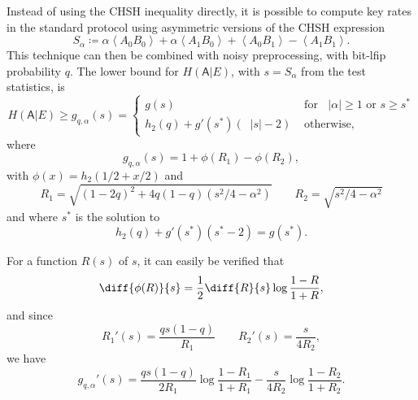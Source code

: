 \documentclass[10pt, a4paper]{article}
\numberwithin{equation}{section} %
\theoremstyle{definition}
\theoremstyle{plain}
\newcommand{\abs}[1]{\mathop{}\left\lvert#1\right\rvert}
\newcommand{\?}{\mathrel{?}} %
\newcommand{\angleb}[1]{\left\langle #1 \right\rangle} %
\newcommand{\crv}[1]{\mathsf{#1}}
\begin{document}
\begin{appendices}
                            Instead of using the CHSH inequality directly, it is possible to compute key rates in the standard protocol using asymmetric versions of the CHSH expression
                            \begin{equation}
                              S_{\alpha} \coloneqq \alpha\angleb{A_0 B_0} + \alpha\angleb{A_1 B_0} + \angleb{A_0 B_1} - \angleb{A_1 B_1}.
                            \end{equation}
                            This technique can then be combined with noisy preprocessing, with bit-lfip probability \(q\). The lower bound for \(H(\crv{A}|E)\), with \(s = S_{\alpha}\) from the test statistics, is
                            \begin{equation} H(\crv{A}|E) \geq g_{q,\alpha}(s) = \begin{cases}
                              g(s) & \text{ for } \abs{\alpha} \geq 1 \text{ or } s \geq s^* \\
                              h_2(q) + g'(s^*)(\abs{s}-2) & \text{ otherwise},
                            \end{cases}
                          \end{equation}
                          where
                          \begin{equation}
                            g_{q,\alpha}(s) = 1 + \phi\left(R_1\right) - \phi\left(R_2\right),
                          \end{equation}
                          with \(\phi(x) = h_2(1/2 + x/2)\) and
                          \begin{equation} 
                            R_1 = \sqrt{{(1-2q)}^2 + 4q(1-q)(s^2/4-\alpha^2)} \qquad R_2 = \sqrt{s^2/4-\alpha^2}
                          \end{equation}
                          and where \(s^*\) is the solution to
                          \begin{equation}\label{eqn:sstar}
                            h_2(q) + g'(s^*) (s^*-2) = g(s^*).
                          \end{equation}

                          For a function \(R(s)\) of \(s\), it can easily be verified that
                          \begin{equation}
                            \diff{\phi(R)}{s} = \frac{1}{2} \diff{R}{s} \log\frac{1-R}{1+R},
                          \end{equation}
                          and since
                          \begin{equation} 
                            R_1'(s) = \frac{qs(1-q)}{R_1} \qquad R_2'(s) = \frac{s}{4R_2},
                          \end{equation}
                          we have
                          \begin{equation}\label{eqn:diffg}
                            g_{q,\alpha}'(s) = \frac{qs(1-q)}{2R_1} \log\frac{1-R_1}{1+R_1} - \frac{s}{4R_2} \log\frac{1-R_2}{1+R_2}.
                          \end{equation}


\end{appendices}
\end{document}
